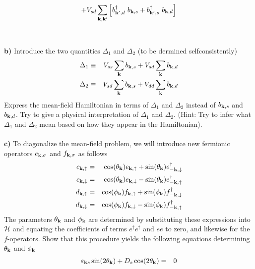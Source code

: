 \begin{problem}
\begin{eqnarray}
		+
		V_{sd}\sum_{{\bf k},{\bf k}^{\prime}}
		\left[ b^{\dagger}_{{\bf k}^{\prime},d}~b_{{\bf k},s} + b^{\dagger}_{{\bf k}^{\prime},s}~b_{{\bf k},d}  \right]  \nonumber
	\end{eqnarray}
	\ \\
	\ \\
	{\bf b)} Introduce the two quantities $\Delta_1$ and $\Delta_2$ (to be dermined selfconsistently)
	\begin{eqnarray}
		\Delta_1 & \equiv & V_{ss} \sum_{\bf k}b_{{\bf k},s} + V_{sd} \sum_{\bf k} b_{{\bf k},d} \nonumber \\
		\Delta_2 & \equiv & V_{sd} \sum_{\bf k}b_{{\bf k},s} + V_{dd} \sum_{\bf k} b_{{\bf k},d} \nonumber
	\end{eqnarray}
	Express the mean-field Hamiltonian in terms of $\Delta_1$ and $\Delta_2$ instead of $b_{{\bf k},s}$ and $b_{{\bf k},d}$. 
	Try to give  a physical interpretation of  $\Delta_1$ and $\Delta_2$. (Hint: Try to infer what $\Delta_1$ and $\Delta_2$ mean based on how they appear in the Hamiltonian). 
	\ \\
	\ \\
	{\bf c)} To diagonalize the mean-field problem, we will introduce new fermionic operators $e_{{\bf k},\sigma}$ and $f_{{\bf k},\sigma}$ as follows
	\begin{eqnarray}
		c_{{\bf k},\uparrow} & = & 
		\cos(\theta_{\bf k}) e_{{\bf k},\uparrow} +  \sin(\theta_{\bf k}) e^{\dagger}_{-{\bf k},\downarrow}  \nonumber \\
		c_{{\bf k},\downarrow} & = & 
		\cos(\theta_{\bf k}) e_{{\bf k},\downarrow} - \sin(\theta_{\bf k}) e^{\dagger}_{-{\bf k},\uparrow} \nonumber \\
		d_{{\bf k},\uparrow} & = & 
		\cos(\phi_{\bf k}) f_{{\bf k},\uparrow} +  \sin(\phi_{\bf k}) f^{\dagger}_{-{\bf k},\downarrow}  \nonumber \\
		d_{{\bf k},\downarrow} & = & 
		\cos(\phi_{\bf k}) f_{{\bf k},\downarrow} - \sin(\phi_{\bf k}) f^{\dagger}_{-{\bf k},\uparrow} \nonumber 
	\end{eqnarray}
	The parameters $\theta_{\bf k}$ and $\phi_{\bf k}$ are determined by substituting these expressions into $\mathcal{H}$ and equating
	the coefficients of terms $e^{\dagger}e^{\dagger}  $ and $e e$ to zero, and likewise for the $f$-operators. Show that this procedure yields the following equations determining  $\theta_{\bf k}$ and $\phi_{\bf k}$
	\begin{eqnarray}
		\varepsilon_{{\bf k} s}  \sin(2 \theta_{\bf k}) +  D_s \cos(2 \theta_{\bf k})  & = & 0 \nonumber \\

\end{eqnarray}
\end{problem}
